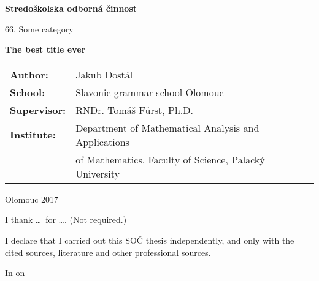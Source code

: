 \pagestyle{empty}
\begin{center}

\medskip

\vfill
{\bfseries\Large{ Stredo\v{s}kolska odborn\'a \v{c}innost}}

\medskip

{66. Some category}
\vfill


\vspace{20mm}

{\LARGE\bfseries The best title ever}

\vfill

\begin{tabular}{ll}
\bfseries Author: & Jakub Dost\'al\\
\bfseries School: & Slavonic grammar school Olomouc\\
\noalign{\vspace{2mm}}
\bfseries Supervisor: & RNDr. Tom\'aš F\"urst, Ph.D.\\
\bfseries Institute: & Department of Mathematical Analysis and Applications\\&  of Mathematics, Faculty of Science, Palack\'y University
\end{tabular}

\vfill
Olomouc 2017
\end{center}


\newpage
\openright

\noindent
I thank \dots\ for \dots. (Not required.)


\newpage

\noindent
I declare that I carried out this SOČ thesis independently, and only with the cited
sources, literature and other professional sources.

\vspace{20mm}
\noindent
In \makebox[4cm]{\dotfill} on \makebox[2.5cm]{\dotfill}
\hspace*{\fill}
\makebox[3cm]{\dotfill}
\hspace*{\fill}

